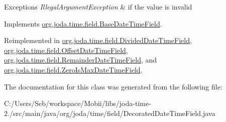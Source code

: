 \begin{DoxyExceptions}{Exceptions}
{\em Illegal\-Argument\-Exception} & if the value is invalid \\
\hline
\end{DoxyExceptions}


Implements \hyperlink{classorg_1_1joda_1_1time_1_1field_1_1_base_date_time_field_ace20661fb97d7f15a921bcc8999aa1fc}{org.\-joda.\-time.\-field.\-Base\-Date\-Time\-Field}.



Reimplemented in \hyperlink{classorg_1_1joda_1_1time_1_1field_1_1_divided_date_time_field_ac0c45a41709ae12c4592a54d68eac4f6}{org.\-joda.\-time.\-field.\-Divided\-Date\-Time\-Field}, \hyperlink{classorg_1_1joda_1_1time_1_1field_1_1_offset_date_time_field_afe8603c5a0bf138a712ee706ce3c25ac}{org.\-joda.\-time.\-field.\-Offset\-Date\-Time\-Field}, \hyperlink{classorg_1_1joda_1_1time_1_1field_1_1_remainder_date_time_field_ae850bdcf2a2682f30fea40eb87a8682e}{org.\-joda.\-time.\-field.\-Remainder\-Date\-Time\-Field}, and \hyperlink{classorg_1_1joda_1_1time_1_1field_1_1_zero_is_max_date_time_field_af04c39572f3c0c695b5238c5e62a2bd9}{org.\-joda.\-time.\-field.\-Zero\-Is\-Max\-Date\-Time\-Field}.



The documentation for this class was generated from the following file\-:\begin{DoxyCompactItemize}
\item 
C\-:/\-Users/\-Seb/workspace/\-Mobii/libs/joda-\/time-\/2./src/main/java/org/joda/time/field/Decorated\-Date\-Time\-Field.\-java\end{DoxyCompactItemize}

